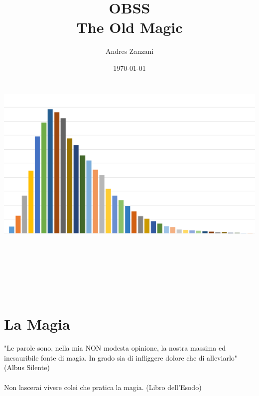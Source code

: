 \documentclass[a4paper,10 pt,twoside,openany]{book}
\begin{document}
	\title{OBSS\\\vspace{1cm}The Old Magic}
	\date{\today\\
		\includegraphics[bb=0 0 1148 636,width=6.85139in,height=3.79514in]{copertina.png}}
	\author{Andres Zanzani}
	\maketitle
	\thispagestyle{empty}

    \newpage~




	\setcounter{page}{1}
	\pagebreak

	\begin{multicols}{2}
		{\small \tableofcontents{}}
	\end{multicols}

	\pagebreak{}



\section{La Magia}


\label{la-magia}
\begin{tcolorbox}[enhanced,arc=5pt,boxrule=0.3pt]{
		"Le parole sono, nella mia NON modesta opinione, la nostra massima ed inesauribile fonte di magia. In grado sia di infliggere dolore che di alleviarlo" (Albus Silente)\\\\
		Non lascerai vivere colei che pratica la magia. (Libro dell'Esodo)} \end{tcolorbox} \medskip
\end{document}
